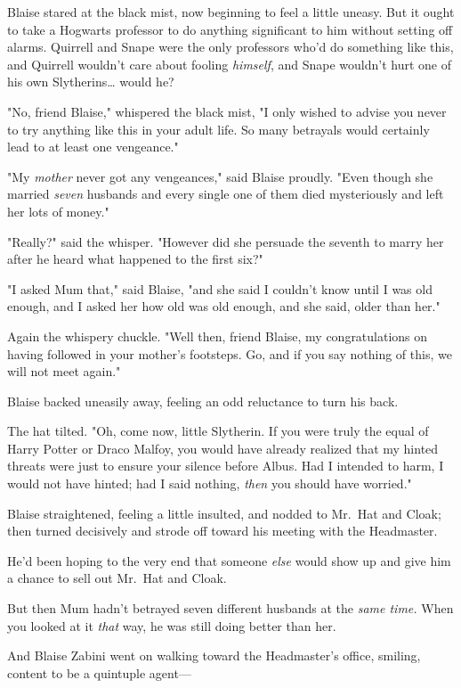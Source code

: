 Blaise stared at the black mist, now beginning to feel a little uneasy. But it
ought to take a Hogwarts professor to do anything significant to him without
setting off alarms. Quirrell and Snape were the only professors who'd do
something like this, and Quirrell wouldn't care about fooling \emph{himself},
and Snape wouldn't hurt one of his own Slytherins{\ldots} would he?

"No, friend Blaise," whispered the black mist, "I only wished to advise you
never to try anything like this in your adult life. So many betrayals would
certainly lead to at least one vengeance."

"My \emph{mother} never got any vengeances," said Blaise proudly. "Even though
she married \emph{seven} husbands and every single one of them died
mysteriously and left her lots of money."

"Really?" said the whisper. "However did she persuade the seventh to marry her
after he heard what happened to the first six?"

"I asked Mum that," said Blaise, "and she said I couldn't know until I was old
enough, and I asked her how old was old enough, and she said, older than her."

Again the whispery chuckle. "Well then, friend Blaise, my congratulations on
having followed in your mother's footsteps. Go, and if you say nothing of this,
we will not meet again."

Blaise backed uneasily away, feeling an odd reluctance to turn his back.

The hat tilted. "Oh, come now, little Slytherin. If you were truly the equal of
Harry Potter or Draco Malfoy, you would have already realized that my hinted
threats were just to ensure your silence before Albus. Had I intended to harm,
I would not have hinted; had I said nothing, \emph{then} you should have
worried."

Blaise straightened, feeling a little insulted, and nodded to Mr.~Hat and
Cloak; then turned decisively and strode off toward his meeting with the
Headmaster.

He'd been hoping to the very end that someone \emph{else} would show up and
give him a chance to sell out Mr.~Hat and Cloak.

But then Mum hadn't betrayed seven different husbands at the \emph{same time.}
When you looked at it \emph{that} way, he was still doing better than her.

And Blaise Zabini went on walking toward the Headmaster's office, smiling,
content to be a quintuple agent---

